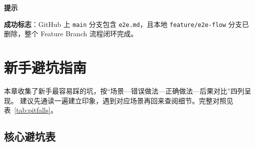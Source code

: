 \documentclass[12pt,a4paper,openany]{ctexbook}
\newenvironment{tipbox}{%
  \medskip
  \noindent\textbf{\faLightbulb\; 提示}
  \smallskip
}{%
  \medskip
}
\begin{document}
\begin{tipbox}
\textbf{成功标志}：GitHub 上 \texttt{main} 分支包含 \texttt{e2e.md}，且本地 \texttt{feature/e2e-flow} 分支已删除，整个 Feature Branch 流程闭环完成。
\end{tipbox}

\chapter{新手避坑指南}

本章收集了新手最容易踩的坑，按“场景—错误做法—正确做法—后果对比”四列呈现。
建议先通读一遍建立印象，遇到对应场景再回来查阅细节。完整对照见表~\ref{tab:pitfalls}。

\section{核心避坑表}
\end{document}

